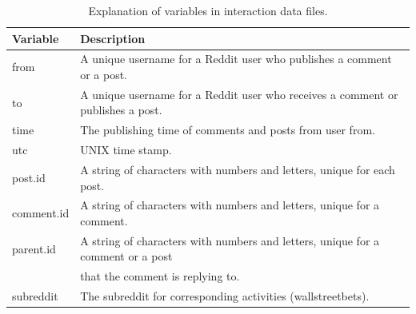 

\begin{table}[h]
	\caption{Explanation of variables in interaction data files.}
	\label{tab:varsummary}
	\centering
	\begin{tabular}[h]{ll}
		\hline \hline 
		Variable & Description \\[0.1ex]
		\hline \hline
		from & A unique username for a Reddit user who publishes a comment or a post.\\
		to & A unique username for a Reddit user who receives a comment or publishes a post.\\
		time & The publishing time of comments and posts from user from.\\
		utc & UNIX time stamp.\\
		post.id & A string of characters with numbers and letters, unique for each post.\\
		comment.id & A string of characters with numbers and letters, unique for a comment. \\
		parent.id & A string of characters with numbers and letters, unique for a comment or a post \\
		&that the comment is replying to.\\
		subreddit & The subreddit for corresponding activities (wallstreetbets).\\
		\hline \hline
	\end{tabular}
\end{table}

